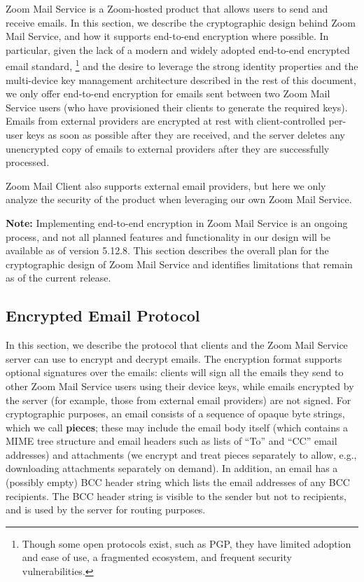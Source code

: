 Zoom Mail Service is a Zoom-hosted product that allows users to send and receive emails. In this
section, we describe the cryptographic design behind Zoom Mail Service, and how it supports
end-to-end encryption where possible. In particular, given the lack of a modern and widely adopted
end-to-end encrypted email standard,%
% 
\footnote{Though some open protocols exist, such as PGP, they have limited adoption and ease of use,
a fragmented ecosystem, and frequent security vulnerabilities.}
%
and the desire to leverage the strong identity properties and the multi-device key management
architecture described in the rest of this document, we only offer end-to-end encryption for emails
sent between two Zoom Mail Service users (who have provisioned their clients to generate the
required keys). Emails from external providers are encrypted at rest with client-controlled per-user keys as
soon as possible after they are received, and the server deletes any unencrypted copy of emails to
external providers after they are successfully processed.

Zoom Mail Client also supports external email providers, but here we only analyze the
security of the product when leveraging our own Zoom Mail Service.

\textbf{Note:} Implementing end-to-end encryption in Zoom Mail Service is an ongoing process, and
not all planned features and functionality in our design will be available as of version 5.12.8.
This section describes the overall plan for the cryptographic design of Zoom Mail Service and
identifies limitations that remain as of the current release.

\subsection{Encrypted Email Protocol}
\label{subsec:emailprotocol}

In this section, we describe the protocol that clients and the Zoom Mail Service server can use to
encrypt and decrypt emails. The encryption format supports optional signatures over the emails:
clients will sign all the emails they send to other Zoom Mail Service users using their device keys,
while emails encrypted by the server (for example, those from external email providers) are not
signed. For cryptographic purposes, an email consists of a sequence of opaque byte strings, which we
call \textbf{pieces}; these may include the email body itself (which contains a MIME tree structure
and email headers such as lists of ``To'' and ``CC'' email addresses) and attachments (we encrypt
and treat pieces separately to allow, e.g., downloading attachments separately on demand). In
addition, an email has a (possibly empty) BCC header string which lists the email addresses of any
BCC recipients. The BCC header string is visible to the sender but not to recipients, and is used by
the server for routing purposes.

